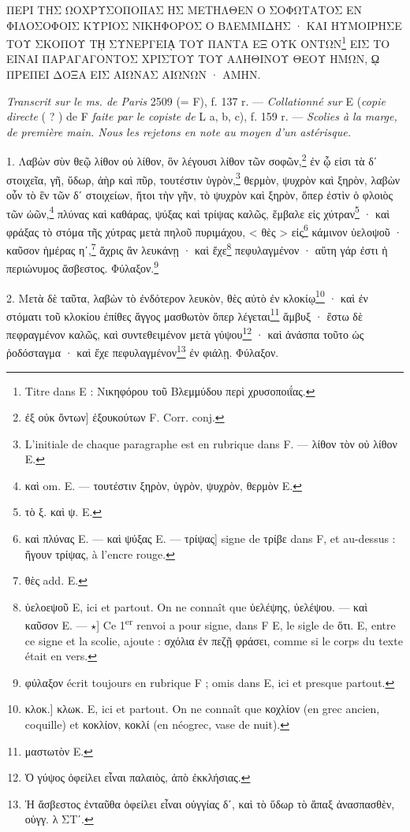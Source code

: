 \documentclass[a4paper, 11pt, oneside, polutonikogreek, french]{article}
\begin{document}
ΠΕΡΙ ΤΗΣ ΩΟΧΡΥΣΟΠΟΙΙΑΣ ΗΣ ΜΕΤΗΛΘΕΝ Ο ΣΟΦΩΤΑΤΟΣ ΕΝ ΦΙΛΟΣΟΦΟΙΣ ΚΥΡΙΟΣ ΝΙΚΗΦΟΡΟΣ Ο ΒΛΕΜΜΙΔΗΣ · ΚΑΙ ΗΥΜΟΙΡΗΣΕ ΤΟΥ ΣΚΟΠΟΥ Τῌ ΣΥΝΕΡΓΕΙᾼ ΤΟΥ ΠΑΝΤΑ ΕΞ ΟΥΚ ΟΝΤΩΝ\footnote{Titre dans E : Νικηφόρου τοῦ Βλεμμύδου περὶ χρυσοποιΐας.} ΕΙΣ ΤΟ ΕΙΝΑΙ ΠΑΡΑΓΑΓΟΝΤΟΣ ΧΡΙΣΤΟΥ ΤΟΥ ΑΛΗΘΙΝΟΥ ΘΕΟΥ ΗΜΩΝ, ῼ ΠΡΕΠΕΙ ΔΟΞΑ ΕΙΣ ΑΙΩΝΑΣ ΑΙΩΝΩΝ · ΑΜΗΝ.

\emph{Transcrit sur le ms. de Paris} 2509 (= F), f. 137 r. --- \emph{Collationné sur} E (\emph{copie directe} ( ? ) de F \emph{faite par le copiste de} L a, b, c), f. 159 r. --- \emph{Scolies à la marge, de première main. Nous les rejetons en note au moyen d'un astérisque.}

\bigskip

1. Λαβὼν σὺν θεῷ λίθον οὐ λίθον, ὃν λέγουσι λίθον τῶν σοφῶν,\footnote{ἐξ οὐκ ὄντων] ἐξουκούτων F. Corr. conj.} ἐν ᾧ εἰσι τὰ δʹ στοιχεῖα, γῆ, ὕδωρ, ἀὴρ καὶ πῦρ, τουτέστιν ὑγρὸν,\footnote{L'initiale de chaque paragraphe est en rubrique dans F. --- λίθον τὸν οὐ λίθον E.} θερμὸν, ψυχρὸν καὶ ξηρὸν, λαβὼν οὖν τὸ ἓν τῶν δʹ στοιχείων, ἤτοι τὴν γῆν, τὸ ψυχρὸν καὶ ξηρὸν, ὅπερ ἐστὶν ὁ φλοιὸς τῶν ὠῶν,\footnote{καὶ om. E. --- τουτέστιν ξηρὸν, ὑγρὸν, ψυχρὸν, θερμὸν E.} πλύνας καὶ καθάρας, ψύξας καὶ τρίψας καλῶς, ἔμβαλε εἰς χύτραν\footnote{τὸ ξ. καὶ ψ. E.} · καὶ φράξας τὸ στόμα τῆς χύτρας μετὰ πηλοῦ πυριμάχου, < θὲς > εἰς\footnote{καὶ πλύνας E. --- καὶ ψύξας E. --- τρίψας] signe de τρίβε dans F, et au-dessus : ἤγουν τρίψας, à l'encre rouge.} κάμινον ὑελοψοῦ · καῦσον ἡμέρας ηʹ,\footnote{θὲς add. E.} ἄχρις ἂν λευκάνῃ · καὶ ἔχε\footnote{ὑελοεψοῦ E, ici et partout. On ne connaît que ὑελέψης, ὑελέψου. --- καὶ καῦσον E. --- $\star$] Ce 1\textsuperscript{er} renvoi a pour signe, dans F E, le sigle de ὅτι. E, entre ce signe et la scolie, ajoute : σχόλια ἐν πεζῇ φράσει, comme si le corps du texte était en vers.} πεφυλαγμένον · αὕτη γάρ ἐστι ἡ περιώνυμος ἄσβεστος. Φύλαξον.\footnote{φύλαξον écrit toujours en rubrique F ; omis dans E, ici et presque partout.}

2. Μετὰ δὲ ταῦτα, λαβὼν τὸ ἐνδότερον λευκὸν, θὲς αὐτὸ ἐν κλοκίῳ\footnote{κλοκ.] κλωκ. E, ici et partout. On ne connaît que κοχλίον (en grec ancien, coquille) et κοκλίον, κοκλί (en néogrec, vase de nuit).} · καὶ ἐν στόματι τοῦ κλοκίου ἐπίθες ἄγγος μασθωτὸν ὅπερ λέγεται\footnote{μαστωτὸν E.} ἄμβυξ · ἔστω δὲ πεφραγμένον καλῶς, καὶ συντεθειμένον μετὰ γύψου\footnote{Ὁ γύψος ὀφείλει εἶναι παλαιὸς, ἀπὸ ἐκκλήσιας.} · καὶ ἀνάσπα τοῦτο ὡς ῥοδόσταγμα · καὶ ἔχε πεφυλαγμένον\footnote{Ἡ ἄσβεστος ἐνταῦθα ὀφείλει εἶναι οὐγγίας δʹ, καὶ τὸ ὕδωρ τὸ ἅπαξ ἀνασπασθὲν, οὐγγ. λ ΣΤʹ.} ἐν φιάλῃ. Φύλαξον.
\end{document}
